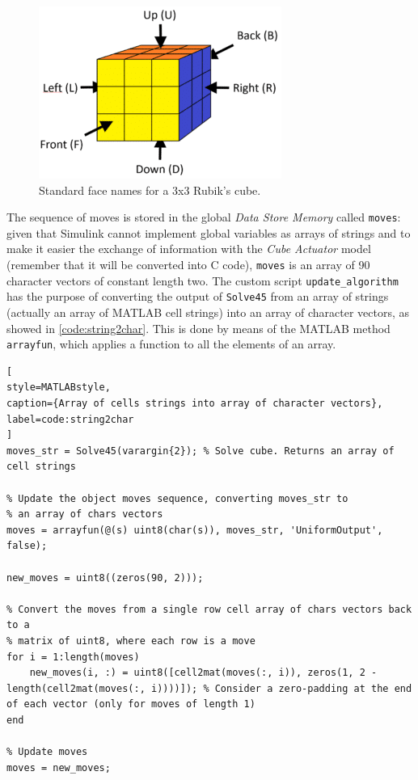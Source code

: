 \documentclass{report}
\begin{document}
\begin{figure}[h]
    \centering
    \includegraphics[width=0.5\linewidth]{images/rubik_cube_model/face_naming.png}
    \caption{Standard face names for a 3x3 Rubik's cube.}
    \label{fig:face_naming}
\end{figure}

The sequence of moves is stored in the global \textit{Data Store Memory} called \texttt{moves}: given that Simulink cannot implement global variables as arrays of strings and to make it easier the exchange of information with the \textit{Cube Actuator} model (remember that it will be converted into C code), \texttt{moves} is an array of 90 character vectors of constant length two. The custom script \texttt{update\_algorithm} has the purpose of converting the output of \texttt{Solve45} from an array of strings (actually an array of MATLAB cell strings) into an array of character vectors, as showed in \ref{code:string2char}. This is done by means of the MATLAB method \texttt{arrayfun}, which applies a function to all the elements of an array.

\begin{lstlisting}[
style=MATLABstyle,
caption={Array of cells strings into array of character vectors},
label=code:string2char
]
moves_str = Solve45(varargin{2}); % Solve cube. Returns an array of cell strings

% Update the object moves sequence, converting moves_str to
% an array of chars vectors
moves = arrayfun(@(s) uint8(char(s)), moves_str, 'UniformOutput', false);

new_moves = uint8((zeros(90, 2)));

% Convert the moves from a single row cell array of chars vectors back to a
% matrix of uint8, where each row is a move
for i = 1:length(moves)
    new_moves(i, :) = uint8([cell2mat(moves(:, i)), zeros(1, 2 - length(cell2mat(moves(:, i))))]); % Consider a zero-padding at the end of each vector (only for moves of length 1)
end

% Update moves
moves = new_moves;
\end{lstlisting}
\end{document}
